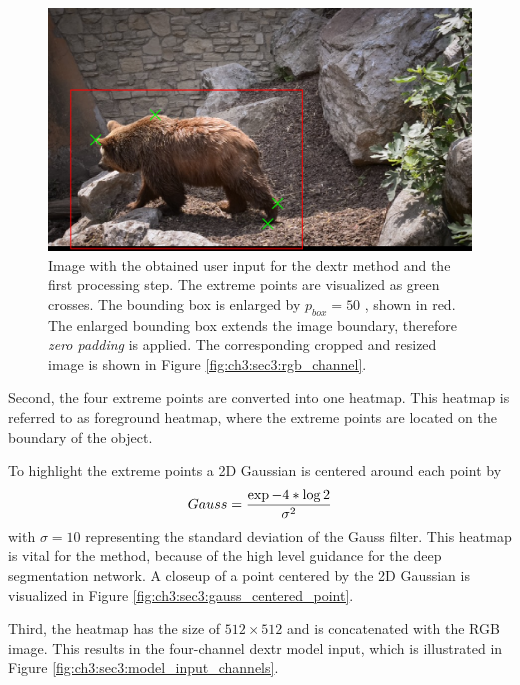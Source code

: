\begin{figure}
	\includegraphics[width=\linewidth]{figures/chap33_bear_bbox.png}
	\caption[DEXTR User Interaction]{		
		Image with the obtained user input for the \gls{dextr} method and the first processing step.
		The extreme points are visualized as green crosses.
		The bounding box is enlarged by $p_{{box}} = 50$ , shown in red.
		The enlarged bounding box extends the image boundary, therefore \textit{zero padding} is applied.
		The corresponding cropped and resized image is shown in Figure \ref{fig:ch3:sec3:rgb_channel}.
	}
	\label{fig:ch3:sec3:user_interaction}
\end{figure}


Second, the four extreme points are converted into one heatmap.
This heatmap is referred to as foreground heatmap, where the extreme points are located on the boundary of the object.

To highlight the extreme points a 2D Gaussian is centered around each point by
\begin{equation} \label{equ:gauss}
	\centering
	Gauss = \frac{\exp{-4 * \log 2 }}{\sigma^{2}}
\end{equation}
with $\sigma = 10$ representing the standard deviation of the Gauss filter.
This heatmap is vital for the method, because of the high level guidance for the deep segmentation network.
A closeup of a point centered by the 2D Gaussian is visualized in Figure \ref{fig:ch3:sec3:gauss_centered_point}.

Third, the heatmap has the size of $512 \times 512$  and is concatenated with the RGB image.
This results in the four-channel \gls{dextr} model input, which is illustrated in Figure \ref{fig:ch3:sec3:model_input_channels}.


